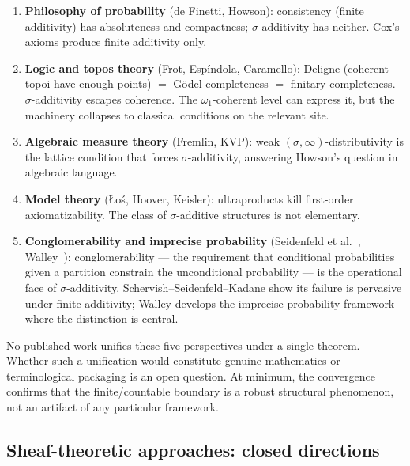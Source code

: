 \begin{enumerate}
  \item \textbf{Philosophy of probability} (de Finetti, Howson):
    consistency (finite additivity) has absoluteness and compactness;
    $\sigma$-additivity has neither.  Cox's axioms produce finite
    additivity only.

  \item \textbf{Logic and topos theory} (Frot, Esp\'{i}ndola,
    Caramello): Deligne (coherent topoi have enough points)
    $=$ G\"{o}del completeness $=$ finitary completeness.
    $\sigma$-additivity escapes coherence.  The
    $\omega_1$-coherent level can express it, but the machinery
    collapses to classical conditions on the relevant site.

  \item \textbf{Algebraic measure theory} (Fremlin, KVP): weak
    $(\sigma,\infty)$-distributivity is the lattice condition that
    forces $\sigma$-additivity, answering Howson's question in
    algebraic language.

  \item \textbf{Model theory} (\L{}o\'{s}, Hoover, Keisler):
    ultraproducts kill first-order axiomatizability.  The class of
    $\sigma$-additive structures is not elementary.

  \item \textbf{Conglomerability and imprecise probability}
    (Seidenfeld et al.~\cite{Seidenfeld1984},
    Walley~\cite{Walley1991}): conglomerability --- the requirement
    that conditional probabilities given a partition constrain the
    unconditional probability --- is the operational face of
    $\sigma$-additivity.  Schervish--Seidenfeld--Kadane show its
    failure is pervasive under finite additivity; Walley develops
    the imprecise-probability framework where the distinction is
    central.
\end{enumerate}

No published work unifies these five perspectives under a single
theorem.  Whether such a unification would constitute genuine
mathematics or terminological packaging is an open question.  At
minimum, the convergence confirms that the finite/countable boundary
is a robust structural phenomenon, not an artifact of any particular
framework.

\subsection{Sheaf-theoretic approaches: closed directions}
\label{sec:sheaf-closed}

